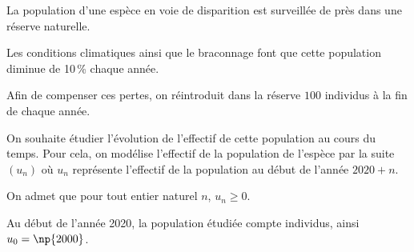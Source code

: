\documentclass[10pt,a4paper]{article}
\begin{document}
\medskip

La population d'une espèce en voie de disparition est surveillée de près dans une réserve naturelle.

Les conditions climatiques ainsi que le braconnage font que cette population diminue de 10\,\% chaque année.

Afin de compenser ces pertes, on réintroduit dans la réserve $100$ individus à la fin de chaque année.

On souhaite étudier l'évolution de l'effectif de cette population au cours du temps. Pour cela, on modélise l'effectif de la population de l'espèce par la suite $\left(u_n\right)$ où $u_n$ représente l'effectif de la population au début de l'année $2020 + n$.

On admet que pour tout entier naturel $n$,\: $u_n \geqslant 0$.

Au début de l'année 2020, la population étudiée compte  individus, ainsi $u_0 = \np{2000}$.

\medskip
\end{document}
